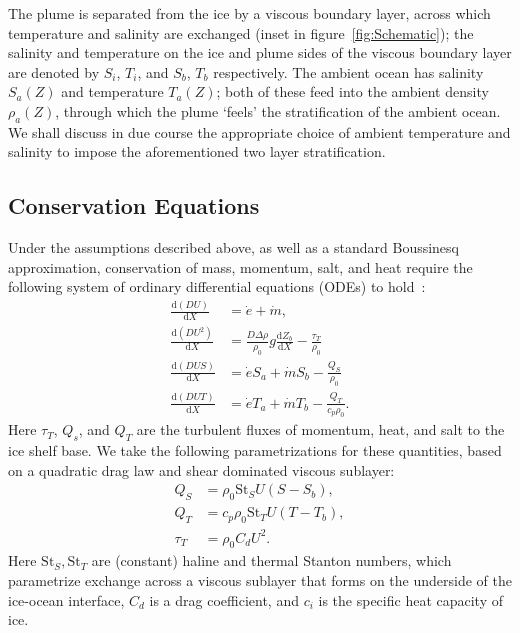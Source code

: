 \documentclass[openacc]{rsproca_new}%
\newcommand{\dd}[2]{\frac{\mathrm{d} #1}{\mathrm{d} #2}}
\begin{document}
The plume is separated from the ice by a viscous boundary layer, across which temperature and salinity are exchanged (inset in figure~\ref{fig:Schematic}); the salinity and temperature on the ice and plume sides of the viscous boundary layer are denoted by $S_i$, $T_i$, and $S_b$, $T_b$ respectively. The ambient ocean has salinity $S_a(Z)$ and temperature $T_a(Z)$; both of these feed into the ambient density $\rho_a(Z)$, through which the plume `feels' the stratification of the ambient ocean.  We shall discuss in due course the appropriate choice of ambient temperature and salinity to impose the aforementioned two layer stratification. 

\subsection{Conservation Equations} 
Under the assumptions described above, as well as a standard Boussinesq approximation, conservation of mass, momentum, salt, and heat require the following system of ordinary differential equations (ODEs) to hold~\citep{Jenkins2011JPhysOcean,Magorrian2016JGeoResOcean}:
\begin{align}
\dd{(DU)}{X} &= \dot{e} + \dot{m},\label{E:Modelling:Model:RawMass}\\
\dd{(DU^2)}{X} &= \frac{D\Delta \rho}{\rho_0} g \dd{Z_b}{X}  -\frac{\tau_T}{\rho_0}\label{E:Modelling:Model:RawMometum}\\
\dd{(DUS)}{X} &= \dot{e}S_a + \dot{m}S_b -\frac{Q_S}{\rho_0}\label{E:Modelling:Model:RawSalt}\\
\dd{(DUT)}{X} &= \dot{e}T_a + \dot{m}T_b -\frac{Q_T}{c_p \rho_0}.\label{E:Modelling:Model:RawTemp}
\end{align}
Here $\tau_T$, $Q_s$, and $Q_T$ are the turbulent fluxes of momentum, heat, and salt to the ice shelf base. We take the following parametrizations for these quantities, based on a quadratic drag law and shear dominated viscous sublayer:
\begin{align}
Q_S &= \rho_0 \mathrm{St}_S U (S - S_b),\label{E:Modelling:Model:TurbulentSalt} \\
Q_T &= c_p \rho_0 \mathrm{St}_T U (T -T_b),\label{E:Modelling:Model:TurbulentHeat}\\
 \tau_T &= \rho_0 C_d U^2.\label{E:Modelling:Model:TurbulentShear}
\end{align}
Here $\mathrm{St}_S, \mathrm{St}_T$ are (constant) haline and thermal Stanton numbers, which parametrize exchange across a viscous sublayer that forms on the underside of the ice-ocean interface, $C_d$ is a drag coefficient, and $c_i$ is the specific heat capacity of ice.  
\end{document}
